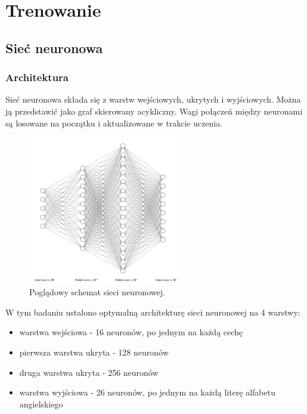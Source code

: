 \section{Trenowanie}\label{sec:trenowanie}
\subsection{Sieć neuronowa}\label{subsec:trenowanie_siec_neuronowa}
\subsubsection{Architektura}\label{subsubsec:architektura_nn}
Sieć neuronowa składa się z warstw wejściowych, ukrytych i wyjściowych. Można ją przedstawić jako graf skierowany acykliczny.
Wagi połączeń między neuronami są losowane na początku i aktualizowane w trakcie uczenia.
\begin{figure}[H]
    \centering
    \includegraphics[width=0.6\textwidth]{img/nn.png}
    \caption{Poglądowy schemat sieci neuronowej.}
    \label{fig:neural_network}
\end{figure}
W tym badaniu ustalono optymalną architekturę sieci neuronowej na 4 warstwy:
\begin{itemize}
    \item warstwa wejściowa - 16 neuronów, po jednym na każdą cechę
    \item pierwsza warstwa ukryta - 128 neuronów
    \item druga warstwa ukryta - 256 neuronów
    \item warstwa wyjściowa - 26 neuronów, po jednym na każdą literę alfabetu angielskiego
\end{itemize}
